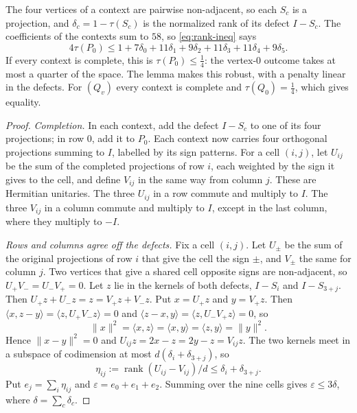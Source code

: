 \documentclass[11pt]{article}
\theoremstyle{definition}
\DeclareMathOperator{\rk}{rank}
\newcommand{\eps}{\varepsilon}
\newcommand{\nrm}[1]{\lVert #1\rVert}
\begin{document}
The four vertices of a context are pairwise non-adjacent, so each $S_c$ is a
projection, and $\delta_c=1-\tau(S_c)$ is the normalized rank of its defect
$I-S_c$.  The coefficients of the contexts sum to $58$, so
\eqref{eq:rank-ineq} says
\[
 4\tau(P_0)\le1+7\delta_0+11\delta_1+9\delta_2+11\delta_3+11\delta_4+9\delta_5 .
\]
If every context is complete, this is $\tau(P_0)\le\frac14$: the vertex-$0$
outcome takes at most a quarter of the space.  The lemma makes this robust,
with a penalty linear in the defects.  For $(Q_v)$ every context is complete
and $\tau(Q_0)=\frac14$, which gives equality.

\begin{proof}
\emph{Completion.}  In each context, add the defect $I-S_c$ to one of its
four projections; in row $0$, add it to $P_0$.  Each context now carries four
orthogonal projections summing to $I$, labelled by its sign patterns.  For a
cell $(i,j)$, let $U_{ij}$ be the sum of the completed projections of row
$i$, each weighted by the sign it gives to the cell, and define $V_{ij}$ in
the same way from column $j$.  These are Hermitian unitaries.  The three
$U_{ij}$ in a row commute and multiply to $I$.  The three $V_{ij}$ in a
column commute and multiply to $I$, except in the last column, where they
multiply to $-I$.

\emph{Rows and columns agree off the defects.}  Fix a cell $(i,j)$.  Let
$U_\pm$ be the sum of the original projections of row $i$ that give the cell
the sign $\pm$, and $V_\pm$ the same for column $j$.  Two vertices that give
a shared cell opposite signs are non-adjacent, so $U_+V_-=U_-V_+=0$.  Let $z$
lie in the kernels of both defects, $I-S_i$ and $I-S_{3+j}$.  Then
$U_+z+U_-z=z=V_+z+V_-z$.  Put $x=U_+z$ and $y=V_+z$.  Then
$\langle x,z-y\rangle=\langle z,U_+V_-z\rangle=0$ and
$\langle z-x,y\rangle=\langle z,U_-V_+z\rangle=0$, so
\[
 \nrm x^2=\langle x,z\rangle=\langle x,y\rangle=\langle z,y\rangle=\nrm y^2 .
\]
Hence $\nrm{x-y}^2=0$ and $U_{ij}z=2x-z=2y-z=V_{ij}z$.  The two kernels meet
in a subspace of codimension at most $d(\delta_i+\delta_{3+j})$, so
\[
 \eta_{ij}:=\rk(U_{ij}-V_{ij})/d\le\delta_i+\delta_{3+j} .
\]
Put $e_j=\sum_i\eta_{ij}$ and $\eps=e_0+e_1+e_2$.  Summing over the nine
cells gives $\eps\le3\delta$, where $\delta=\sum_c\delta_c$.


\end{proof}
\end{document}
